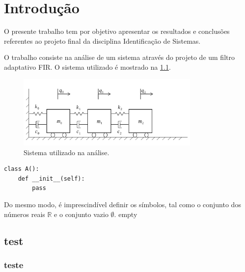 \chapter{Introdução}

O presente trabalho tem por objetivo apresentar os resultados e conclusões referentes ao projeto final da disciplina Identificação de Sistemas.

O trabalho consiste na análise de um sistema através do projeto de um filtro adaptativo FIR. O sistema utilizado é mostrado na \cref{fig:sistema}. 

\begin{figure}[!h]
	\centering
	\includegraphics[width=0.8\textwidth]{IMGS/sistema.pdf}
	\caption{Sistema utilizado na análise.}
	\label{fig:sistema}
\end{figure}

\begin{verbatim}
class A():
	def __init__(self):
		pass
\end{verbatim}

Do mesmo modo, é imprescindível definir os símbolos, tal como o
conjunto dos números reais $\mathbb{R}$ e o conjunto vazio $\emptyset$.
 empty 


\section{test}
\subsection{teste}